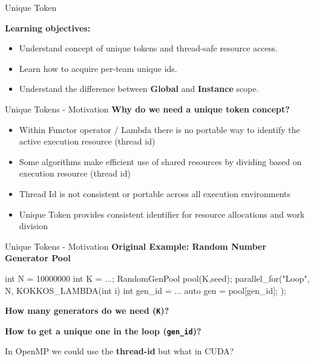 
\begin{frame}[fragile]{}

  {\Huge{Unique Token}}

  \vspace{20pt}

  \textbf{Learning objectives:}
  \begin{itemize}
    \item {Understand concept of unique tokens and thread-safe resource access. }
    \item {Learn how to acquire per-team unique ids.}
    \item {Understand the difference between \textbf{Global} and \textbf{Instance} scope.}
  \end{itemize}

  \vspace{-20pt}

\end{frame}


\begin{frame}[fragile]{Unique Tokens - Motivation}
\textbf{Why do we need a unique token concept?}
\begin{itemize}
\item{Within Functor operator / Lambda there is no portable way to identify the active execution resource (thread id)}
\item{Some algorithms make efficient use of shared resources by dividing based on execution resource (thread id)}
\item{Thread Id is not consistent or portable across all execution environments}
\item{Unique Token provides consistent identifier for resource allocations and work division}
\end{itemize}

\end{frame}


\begin{frame}[fragile]{Unique Tokens - Motivation}
\textbf{Original Example: Random Number Generator Pool}

\begin{code}
int N = 10000000
int K = ...;
RandomGenPool pool(K,seed);
parallel_for("Loop", N, KOKKOS_LAMBDA(int i) {
  int gen_id = ...
  auto gen = pool[gen_id];
});
\end{code}

\vspace{5pt}
\textbf{How many generators do we need (\texttt{K})?}

\pause
\vspace{5pt}
\textbf{How to get a unique one in the loop (\texttt{gen\_id})?}

\pause
\vspace{5pt}
In OpenMP we could use the \textbf{thread-id} but what in CUDA?

\end{frame}

